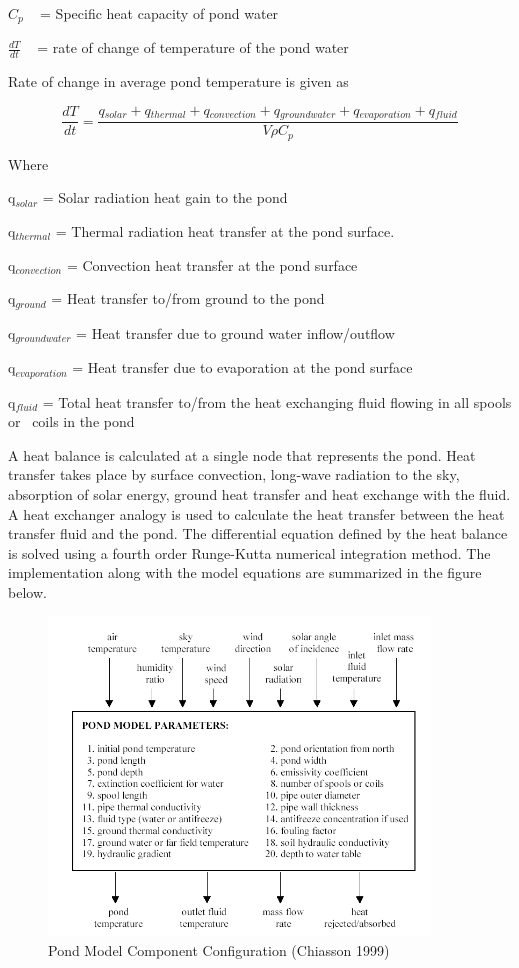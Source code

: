 \(C{}_p\) ~ = Specific heat capacity of pond water

\(\frac{{dT}}{{dt}}\) ~ = rate of change of temperature of the pond water

Rate of change in average pond temperature is given as

\begin{equation}
\frac{{dT}}{{dt}} = \frac{{q{}_{solar} + q{}_{thermal} + q{}_{convection} + q{}_{groundwater} + q{}_{evaporation} + q{}_{fluid}}}{{V\rho C{}_p}}
\end{equation}

Where

q\(_{solar}\) = Solar radiation heat gain to the pond

q\(_{thermal}\) = Thermal radiation heat transfer at the pond surface.

q\(_{convection}\) = Convection heat transfer at the pond surface

q\(_{ground}\) = Heat transfer to/from ground to the pond

q\(_{groundwater}\) = Heat transfer due to ground water inflow/outflow

q\(_{evaporation}\) = Heat transfer due to evaporation at the pond surface

q\(_{fluid}\) = Total heat transfer to/from the heat exchanging fluid flowing in all spools or~ coils in the pond

A heat balance is calculated at a single node that represents the pond. Heat transfer takes place by surface convection, long-wave radiation to the sky, absorption of solar energy, ground heat transfer and heat exchange with the fluid. A heat exchanger analogy is used to calculate the heat transfer between the heat transfer fluid and the pond. The differential equation defined by the heat balance is solved using a fourth order Runge-Kutta numerical integration method. The implementation along with the model equations are summarized in the figure below.

\begin{figure}[hbtp] %
\centering
\includegraphics[width=0.9\textwidth, height=0.9\textheight, keepaspectratio=true]{media/image5686.png}
\caption{Pond Model Component Configuration (Chiasson 1999) \protect \label{fig:pond-model-component-configuration-chiasson}}
\end{figure}

